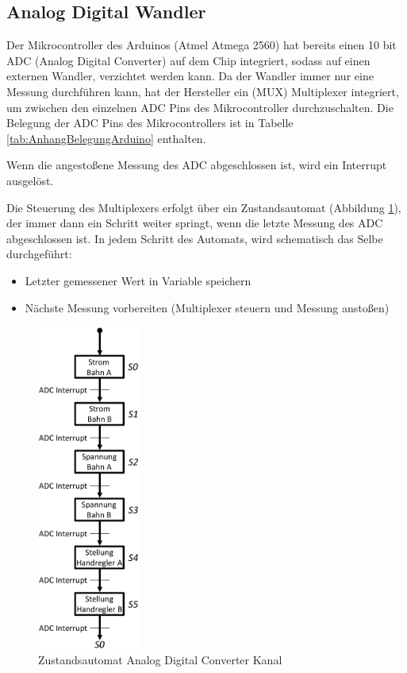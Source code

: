 \documentclass[a4paper, 11pt]{report}
\begin{document}
	\subsection{Analog Digital Wandler}\label{subsec:ADC}

		Der Mikrocontroller des Arduinos (Atmel Atmega 2560) hat bereits einen 10 bit ADC (Analog Digital Converter) auf dem Chip integriert, sodass auf einen externen Wandler, verzichtet werden kann.
		Da der Wandler immer nur eine Messung durchführen kann, hat der Hersteller ein (MUX) Multiplexer integriert, um zwischen den einzelnen ADC Pins des Mikrocontroller durchzuschalten.
		Die Belegung der ADC Pins des Mikrocontrollers ist in Tabelle \ref{tab:AnhangBelegungArduino} enthalten.

		Wenn die angestoßene Messung des ADC abgeschlossen ist, wird ein Interrupt ausgelöst.


		Die Steuerung des Multiplexers erfolgt über ein Zustandsautomat (Abbildung \ref{img:ADCMUX}), der immer dann ein Schritt weiter springt, wenn die letzte Messung des ADC abgeschlossen ist. In jedem Schritt des Automats, wird schematisch das Selbe durchgeführt:
		\begin{itemize}
		\item	Letzter gemessener Wert in Variable speichern
		\item Nächste Messung vorbereiten (Multiplexer steuern und Messung anstoßen)
		\end{itemize}

		\begin{figure}[ht]
			\centering
			\includegraphics[width=0.3\textwidth]{rec/ADCAutomat.png}
			\caption{Zustandsautomat Analog Digital Converter Kanal}
			\label{img:ADCMUX}
		\end{figure}
\end{document}
